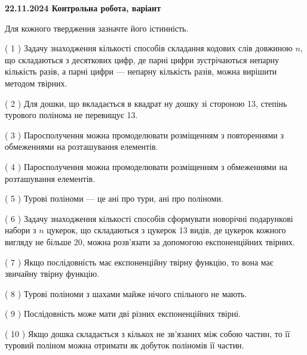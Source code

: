 \documentclass[12pt, ukrainian]{article}
\begin{document}
\vspace{4mm}
\newpage
\begin {large}

\textbf{22.11.2024 Контрольна робота, варіант  }\par


{
Для кожного твердження зазначте його істинність.\par
\vspace{2mm}
( 1 ) Задачу знаходження кількості способів складання кодових слів довжиною $n$, що складаються з десяткових цифр, де парні цифри зустрічаються непарну кількість разів, а парні цифри — непарну кількість разів, можна вирішити методом твірних.%

( 2 ) Для дошки, що вкладається в квадрат ну дошку зі стороною 13, степінь турового полінома не перевищує 13.%

( 3 ) Паросполучення можна промоделювати розміщенням з повтореннями з обмеженнями на розташування елементів.%

( 4 ) Паросполучення можна промоделювати розміщенням з обмеженнями на розташування елементів.%

( 5 ) Турові поліноми --- це ані про тури, ані про поліноми.%

( 6 ) Задачу знаходження кількості способів сформувати новорічні подарункові набори з $n$ цукерок, що складаються з цукерок 13 видів, де цукерок кожного вигляду не більше 20, можна розв’язати за допомогою експоненційних твірних.%

( 7 ) Якщо послідовність має експоненційну твірну функцію, то вона має звичайну твірну функцію.%

( 8 ) Турові поліноми з шахами майже нічого спільного не мають.%

( 9 ) Послідовність може мати дві різних експоненційних твірні.%

( 10 ) Якщо дошка складається з кількох не зв’язаних між собою частин, то її туровий поліном можна отримати як добуток поліномів її частин.%


\vspace{5mm}
}
\end {large}
\end{document}
